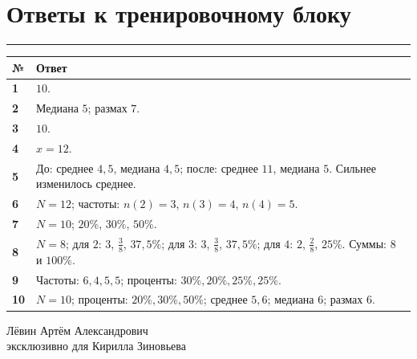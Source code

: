 \documentclass[a4paper,12pt]{article}
\newcommand{\sect}[1]{\vspace{0.8em}\section*{\color{darkaccent}\large #1}\vspace{-0.6em}\color{accent}\rule{\linewidth}{0.45pt}\color{textgray}\vspace{0.3em}}
\begin{document}
\clearpage
\sect{Ответы к тренировочному блоку}
\renewcommand{\arraystretch}{1.42}
\begin{tabularx}{\linewidth}{@{}>{\bfseries}p{14mm}X@{}}
\toprule
№ & Ответ \\
\midrule
1 & $10$. \\
2 & Медиана $5$; размах $7$. \\
3 & $10$. \\
4 & $x=12$. \\
5 & До: среднее $4{,}5$, медиана $4{,}5$; после: среднее $11$, медиана $5$. Сильнее изменилось среднее. \\
6 & $N=12$; частоты: $n(2)=3$, $n(3)=4$, $n(4)=5$. \\
7 & $N=10$; $20\%$, $30\%$, $50\%$. \\
8 & $N=8$; для $2$: $3$, $\frac38$, $37{,}5\%$; для $3$: $3$, $\frac38$, $37{,}5\%$; для $4$: $2$, $\frac28$, $25\%$. Суммы: $8$ и $100\%$. \\
9 & Частоты: $6,4,5,5$; проценты: $30\%,20\%,25\%,25\%$. \\
10 & $N=10$; проценты: $20\%,30\%,50\%$; среднее $5{,}6$; медиана $6$; размах $6$. \\
\bottomrule
\end{tabularx}
\vfill
\begin{center}
\color{muted}\footnotesize Лёвин Артём Александрович\\ эксклюзивно для Кирилла Зиновьева
\end{center}
\end{document}
